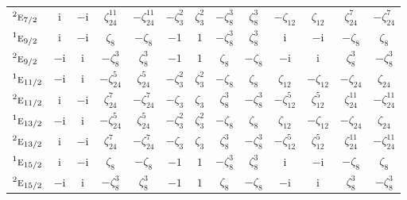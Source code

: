 \documentclass[10pt,a4paper]{article}
\numberwithin{equation}{section}
\newcommand{\irr}[1]{\text{\normalfont\scshape #1}}
\newcommand{\conjpair}[1]{{}^{#1}}
\newcommand{\iunit}{\mathrm{i}}
\newcommand{\rootunity}[1]{\zeta_{#1}}
\begin{document}
{\begin{longtable}{@{}lcccccccccccc@{}}
$\conjpair{2}\irr{e}_{7/2}$ & $\iunit{}$ & $-\iunit{}$ & $\rootunity{24}^{11}$ & $-\rootunity{24}^{11}$ & $-\rootunity{3}^{2}$ & $\rootunity{3}^{2}$ & $-\rootunity{8}^{3}$ & $\rootunity{8}^{3}$ & $-\rootunity{12}$ & $\rootunity{12}$ & $\rootunity{24}^{7}$ & $-\rootunity{24}^{7}$\\
$\conjpair{1}\irr{e}_{9/2}$ & $\iunit{}$ & $-\iunit{}$ & $\rootunity{8}$ & $-\rootunity{8}$ & $-1$ & $1$ & $-\rootunity{8}^{3}$ & $\rootunity{8}^{3}$ & $\iunit{}$ & $-\iunit{}$ & $-\rootunity{8}$ & $\rootunity{8}$\\
$\conjpair{2}\irr{e}_{9/2}$ & $-\iunit{}$ & $\iunit{}$ & $-\rootunity{8}^{3}$ & $\rootunity{8}^{3}$ & $-1$ & $1$ & $\rootunity{8}$ & $-\rootunity{8}$ & $-\iunit{}$ & $\iunit{}$ & $\rootunity{8}^{3}$ & $-\rootunity{8}^{3}$\\
$\conjpair{1}\irr{e}_{11/2}$ & $-\iunit{}$ & $\iunit{}$ & $-\rootunity{24}^{5}$ & $\rootunity{24}^{5}$ & $-\rootunity{3}^{2}$ & $\rootunity{3}^{2}$ & $-\rootunity{8}$ & $\rootunity{8}$ & $\rootunity{12}$ & $-\rootunity{12}$ & $-\rootunity{24}$ & $\rootunity{24}$\\
$\conjpair{2}\irr{e}_{11/2}$ & $\iunit{}$ & $-\iunit{}$ & $\rootunity{24}^{7}$ & $-\rootunity{24}^{7}$ & $-\rootunity{3}$ & $\rootunity{3}$ & $\rootunity{8}^{3}$ & $-\rootunity{8}^{3}$ & $-\rootunity{12}^{5}$ & $\rootunity{12}^{5}$ & $\rootunity{24}^{11}$ & $-\rootunity{24}^{11}$\\
$\conjpair{1}\irr{e}_{13/2}$ & $-\iunit{}$ & $\iunit{}$ & $-\rootunity{24}^{5}$ & $\rootunity{24}^{5}$ & $-\rootunity{3}^{2}$ & $\rootunity{3}^{2}$ & $-\rootunity{8}$ & $\rootunity{8}$ & $\rootunity{12}$ & $-\rootunity{12}$ & $-\rootunity{24}$ & $\rootunity{24}$\\
$\conjpair{2}\irr{e}_{13/2}$ & $\iunit{}$ & $-\iunit{}$ & $\rootunity{24}^{7}$ & $-\rootunity{24}^{7}$ & $-\rootunity{3}$ & $\rootunity{3}$ & $\rootunity{8}^{3}$ & $-\rootunity{8}^{3}$ & $-\rootunity{12}^{5}$ & $\rootunity{12}^{5}$ & $\rootunity{24}^{11}$ & $-\rootunity{24}^{11}$\\
$\conjpair{1}\irr{e}_{15/2}$ & $\iunit{}$ & $-\iunit{}$ & $\rootunity{8}$ & $-\rootunity{8}$ & $-1$ & $1$ & $-\rootunity{8}^{3}$ & $\rootunity{8}^{3}$ & $\iunit{}$ & $-\iunit{}$ & $-\rootunity{8}$ & $\rootunity{8}$\\
$\conjpair{2}\irr{e}_{15/2}$ & $-\iunit{}$ & $\iunit{}$ & $-\rootunity{8}^{3}$ & $\rootunity{8}^{3}$ & $-1$ & $1$ & $\rootunity{8}$ & $-\rootunity{8}$ & $-\iunit{}$ & $\iunit{}$ & $\rootunity{8}^{3}$ & $-\rootunity{8}^{3}$\\

\end{longtable}}
\end{document}
